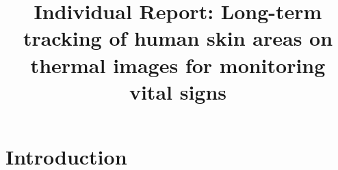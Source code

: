 \documentclass[conference]{IEEEtran}
\begin{document}
\title{Individual Report: Long-term tracking of human skin areas on thermal images for monitoring vital signs\\}

\author{

}

\maketitle


\section{Introduction}
\end{document}
